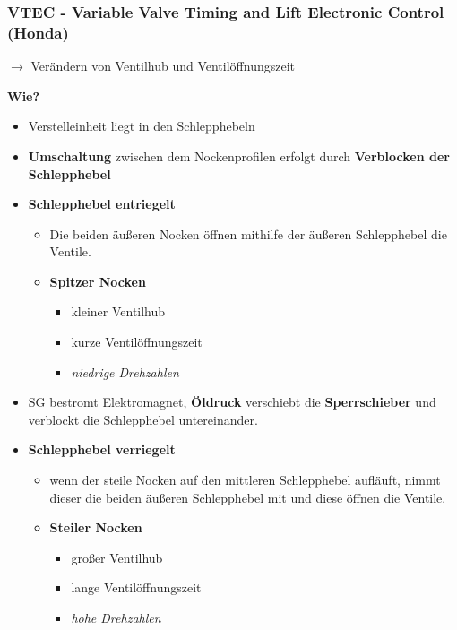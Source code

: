 \subsubsection{VTEC - Variable Valve Timing and Lift Electronic Control
(Honda)}\label{vtec-variable-valve-timing-and-lift-electronic-control-honda}

$\to$ Verändern von Ventilhub und Ventilöffnungszeit

\textbf{Wie?}

\begin{itemize}
\item
  Verstelleinheit liegt in den Schlepphebeln
\item
  \textbf{Umschaltung} zwischen dem Nockenprofilen erfolgt durch
  \textbf{Verblocken der Schlepphebel}
\item
  \textbf{Schlepphebel entriegelt}

  \begin{itemize}
  \item
    Die beiden äußeren Nocken öffnen mithilfe der äußeren Schlepphebel
    die Ventile.
  \item
    \textbf{Spitzer Nocken}

    \begin{itemize}
    \item
      kleiner Ventilhub
    \item
      kurze Ventilöffnungszeit
    \item
      \emph{niedrige Drehzahlen}
    \end{itemize}
  \end{itemize}
\item
  SG bestromt Elektromagnet, \textbf{Öldruck} verschiebt die
  \textbf{Sperrschieber} und verblockt die Schlepphebel untereinander.
\item
  \textbf{Schlepphebel verriegelt}

  \begin{itemize}
  \item
    wenn der steile Nocken auf den mittleren Schlepphebel aufläuft,
    nimmt dieser die beiden äußeren Schlepphebel mit und diese öffnen
    die Ventile.
  \item
    \textbf{Steiler Nocken}

    \begin{itemize}
    \item
      großer Ventilhub
    \item
      lange Ventilöffnungszeit
    \item
      \emph{hohe Drehzahlen}
    \end{itemize}
  \end{itemize}
\end{itemize}


